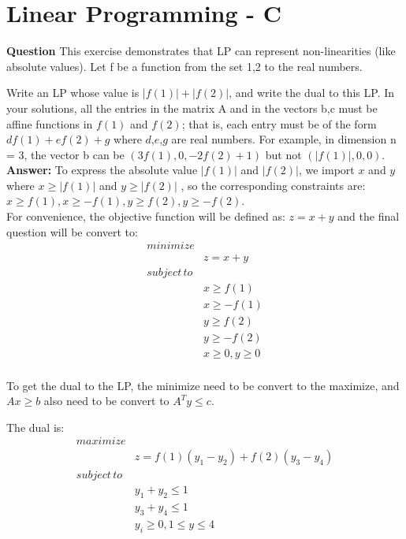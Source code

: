 \documentclass[12pt]{article}
\begin{document}
\section{Linear Programming - C}
\textbf{Question}
This exercise demonstrates that LP can represent non-linearities (like absolute values). Let f be a function from the set {1,2} to the real numbers. 

Write an LP whose value is $|f(1)|+|f(2)|$, and write the dual to this LP. In your solutions, all the entries in the matrix A and in the vectors b,c must be affine functions in $f(1)$ and $f(2)$; that is, each entry must be of the form $d f(1) + e f(2) + g$ where $d$,$e$,$g$ are real numbers. For example, in dimension n = 3, the vector b can be $(3 f(1), 0, -2f(2)+1)$ but not $(|f(1)|,0,0)$. \\
\textbf{Answer:}
To express the absolute value  $|f(1)|$ and $|f(2)|$,  we import $x$ and $y$ where $x  \geq|f(1)|$ and $y  \geq|f(2)|$ , so the corresponding constraints are: $x \geq f(1), x \geq -f(1), y \geq f(2), y \geq -f(2)$.\\
For convenience, the objective function will be defined as:
$z = x + y$ and the final question will be convert to:\\
\begin{equation}
\begin{aligned}
minimize& \\
& z = x + y\\
subject \, to&  \\
& x \geq f(1)\\
& x \geq -f(1)\\
& y \geq f(2)\\
& y \geq -f(2)\\
& x\geq 0, y \geq 0\\
\end{aligned}
\end{equation}

To get the dual to the LP,  the minimize need to be convert to the maximize, and $Ax \geq b$ also need to be convert to $A^Ty \leq c$.

The dual is:
\begin{equation}
\begin{aligned}
maximize& \\
& z = f(1)(y_{1} - y_{2}) + f(2)(y_{3} - y_{4}) \\
subject \, to&  \\
& y_{1} + y_{2} \leq 1\\
& y_{3} + y_{4} \leq 1\\
& y_{i}\geq 0, 1\leq y \leq 4\\
\end{aligned}
\end{equation}
\end{document}
